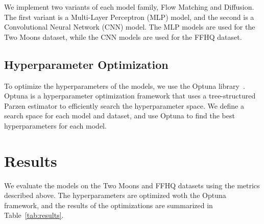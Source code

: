 \documentclass{article}
\begin{document}
We implement two variants of each model family, Flow Matching and Diffusion. The first variant is a Multi-Layer Perceptron (MLP) model, and the second is a Convolutional Neural Network (CNN) model. The MLP models are used for the Two Moons dataset, while the CNN models are used for the FFHQ dataset.

\subsection{Hyperparameter Optimization}

To optimize the hyperparameters of the models, we use the Optuna library~\cite{akiba2019optuna}. Optuna is a hyperparameter optimization framework that uses a tree-structured Parzen estimator to efficiently search the hyperparameter space. We define a search space for each model and dataset, and use Optuna to find the best hyperparameters for each model.

\section{Results}
We evaluate the models on the Two Moons and FFHQ datasets using the metrics described above. The hyperparameters are optimized woth the Optuna framework, and the results of the optimizations are summarized in Table~\ref{tab:results}.
\end{document}
